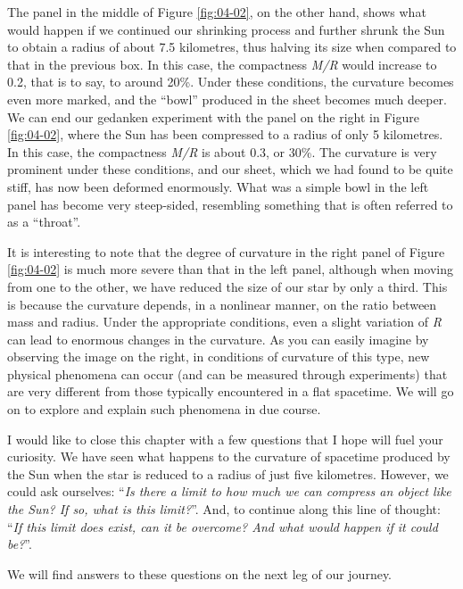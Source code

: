 The panel in the middle of Figure \ref{fig:04-02}, on the other hand, shows what would happen if we
continued our shrinking process and further shrunk the Sun to obtain a radius of about
7.5 kilometres, thus halving its size when compared to that in the previous box. In this
case, the compactness \emph{M/R} would increase to 0.2, that is to say, to around 20\%.
Under these conditions, the curvature becomes even more marked, and the ``bowl''
produced in the sheet becomes much deeper. We can end our gedanken experiment with the
panel on the right in Figure \ref{fig:04-02}, where the Sun has been compressed to a radius of only
5 kilometres. In this case, the compactness \emph{M/R} is about 0.3, or 30\%. The
curvature is very prominent under these conditions, and our sheet, which we had found to
be quite stiff, has now been deformed enormously. What was a simple bowl in the left
panel has become very steep-sided, resembling something that is often referred to as a
``throat''.

It is interesting to note that the degree of curvature in the right panel of Figure \ref{fig:04-02}
is much more severe than that in the left panel, although when moving from one to the
other, we have reduced the size of our star by only a third. This is because the
curvature depends, in a nonlinear manner, on the ratio between mass and radius. Under
the appropriate conditions, even a slight variation of \emph{R} can lead to enormous
changes in the curvature. As you can easily imagine by observing the image on the right,
in conditions of curvature of this type, new physical phenomena can occur (and can be
measured through experiments) that are very different from those typically encountered
in a flat spacetime. We will go on to explore and explain such phenomena in due course.

I would like to close this chapter with a few questions that I hope will fuel your
curiosity. We have seen what happens to the curvature of spacetime produced by the Sun
when the star is reduced to a radius of just five kilometres. However, we could ask
ourselves: ``\emph{Is there a limit to how much we can compress an object like the Sun?
If so, what is this limit?}''. And, to continue along this line of thought: ``\emph{If
this limit does exist, can it be overcome? And what would happen if it could be?}''.

We will find answers to these questions on the next leg of our journey.
